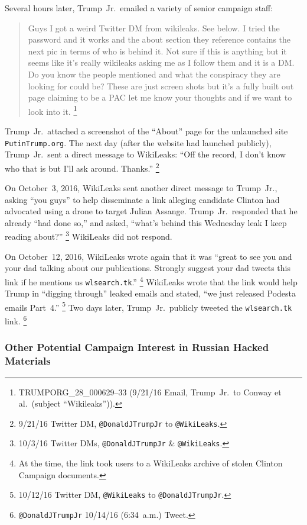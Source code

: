 Several hours later, Trump~Jr.\ emailed a variety of senior campaign staff:

\begin{quote}
Guys I got a weird Twitter DM from wikileaks.
See below.
I tried the password and it works and the about section they reference contains the next pic in terms of who is behind it.
Not sure if this is anything but it seems like it's really wikileaks asking me as I follow them and it is a DM\null.
Do you know the people mentioned and what the conspiracy they are looking for could be?
These are just screen shots but it's a fully built out page claiming to be a PAC let me know your thoughts and if we want to look into it.%
\footnote{TRUMPORG\_28\_000629--33 (9/21/16 Email, Trump~Jr.\ to Conway et al.\ (subject ``Wikileaks'')).}
\end{quote}

Trump~Jr.\ attached a screenshot of the ``About'' page for the unlaunched site \verb+PutinTrump.org+.
The next day (after the website had launched publicly), Trump~Jr.\ sent a direct message to WikiLeaks:
``Off the record, I don't know who that is but I'll ask around. Thanks.''%
\footnote{9/21/16 Twitter DM, \verb+@DonaldJTrumpJr+ to \verb+@WikiLeaks+.}

On October~3, 2016, WikiLeaks sent another direct message to Trump~Jr., asking ``you guys'' to help disseminate a link alleging candidate Clinton had advocated using a drone to target Julian Assange.
Trump~Jr.\ responded that he already ``had done so,'' and asked, ``what's behind this Wednesday leak I keep reading about?''%
\footnote{10/3/16 Twitter DMs, \verb+@DonaldJTrumpJr+ \& \verb+@WikiLeaks+.}
WikiLeaks did not respond.

On October~12, 2016, WikiLeaks wrote again that it was ``great to see you and your dad talking about our publications.
Strongly suggest your dad tweets this link if he mentions us \verb+wlsearch.tk+.''%
\footnote{At the time, the link took users to a WikiLeaks archive of stolen Clinton Campaign documents.}
WikiLeaks wrote that the link would help Trump in ``digging through'' leaked emails and stated, ``we just released Podesta emails Part~4.''%
\footnote{10/12/16 Twitter DM, \verb+@WikiLeaks+ to \verb+@DonaldJTrumpJr+.}
Two days later, Trump~Jr.\ publicly tweeted the \verb+wlsearch.tk+ link.%
\footnote{\verb+@DonaldJTrumpJr+ 10/14/16 (6:34~a.m.) Tweet.}

\subsubsection{Other Potential Campaign Interest in Russian Hacked Materials}

